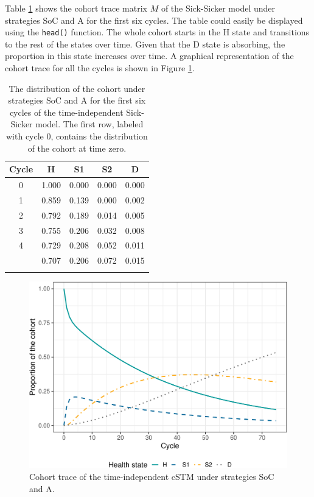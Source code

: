 \documentclass[
]{article}
\begin{document}
Table \ref{tab:Trace} shows the cohort trace matrix \(M\) of the Sick-Sicker model under strategies SoC and A for the first six cycles. The table could easily be displayed using the \texttt{head()} function. The whole cohort starts in the H state and transitions to the rest of the states over time. Given that the D state is absorbing, the proportion in this state increases over time. A graphical representation of the cohort trace for all the cycles is shown in Figure \ref{fig:Sick-Sicker-Trace-TimeHom}.

\begin{table}[!h]

\caption{\label{tab:Trace}The distribution of the cohort under strategies SoC and A for the first six cycles of the time-independent Sick-Sicker model. The first row, labeled with cycle 0, contains the distribution of the cohort at time zero.}
\centering
\begin{tabular}[t]{ccccc}
\toprule{}
Cycle & H & S1 & S2 & D\\
\midrule{}
0 & 1.000 & 0.000 & 0.000 & 0.000\\
1 & 0.859 & 0.139 & 0.000 & 0.002\\
2 & 0.792 & 0.189 & 0.014 & 0.005\\
3 & 0.755 & 0.206 & 0.032 & 0.008\\
4 & 0.729 & 0.208 & 0.052 & 0.011\\
\addlinespace
5 & 0.707 & 0.206 & 0.072 & 0.015\\
\bottomrule{}
\end{tabular}
\end{table}

\begin{figure}[H]

{\centering \includegraphics{figs/Sick-Sicker-Trace-TimeHom-1} 

}

\caption{Cohort trace of the time-independent cSTM under strategies SoC and A.}\label{fig:Sick-Sicker-Trace-TimeHom}
\end{figure}
\end{document}
